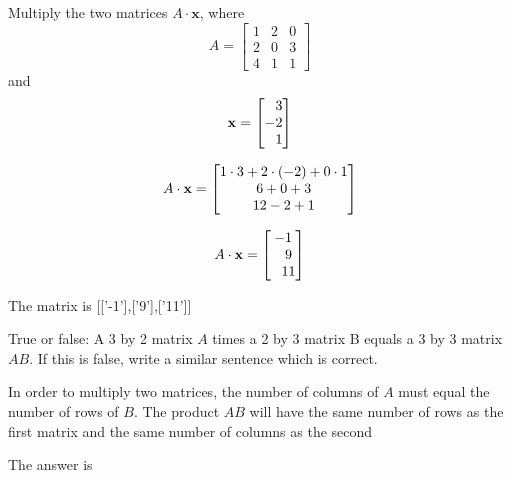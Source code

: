 \documentclass{ximera}
\begin{document}
\begin{question}
Multiply the two matrices $A \cdot \mathbf{x}$,
where 
\[A = \begin{bmatrix} 1&2&0\\2&0&3\\4&1&1 \end{bmatrix}\] and \[\mathbf{x} = \begin{bmatrix}\phantom{-}3\\-2\\\phantom{-}1\end{bmatrix}\]

\begin{solution}
\begin{hint}
\[A \cdot \mathbf{x} = \begin{bmatrix}1\cdot3+2\cdot(-2)+0\cdot1\\6+0+3\\12-2+1\end{bmatrix}\]
\end{hint}

\begin{hint}
\[A \cdot \mathbf{x} = \begin{bmatrix}-1\\\phantom{-}9\\\phantom{-}11\end{bmatrix}\]
\end{hint}

\begin{matrixAnswer}[name=M]
      The matrix is  [['-1'],['9'],['11']]
 \end{matrixAnswer}
\end{solution}
\end{question}

\begin{question}
True or false: A 3 by 2 matrix $A$ times a 2 by 3 matrix B equals a 3 by 3 matrix $AB$. 
If this is false, write a similar sentence which is correct.
\begin{solution}
\begin{hint}
In order to multiply two matrices, the number of columns of $A$ must equal the number of rows of $B$. The product $AB$ will have the same number of rows as the first matrix and the same number of columns as the second
\end{hint}
The answer is 
\end{solution}
\end{question}
\end{document}
